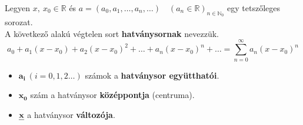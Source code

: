 \documentclass[tikz,12pt,margin=0px]{article}
\makeatletter
\renewcommand\paragraph{%
	\@startsection{paragraph}{4}{0mm}%
	{-\baselineskip}%
	{.5\baselineskip}%
	{\normalfont\normalsize\bfseries}}
\makeatother
\begin{document}
	






    \noindent Legyen $x,\ x_{0} \in \mathbb{R}$ és $a =(a_{0}, a_{1},\ldots, a_{n}, \ldots)\quad (a_{n} \in \mathbb{R})_{n \in \mathbb{N}_{0}}$ egy tetszőleges sorozat. \\
    A következő alakú végtelen sort \textbf{hatványsornak} nevezzük.
    \[
        a_{0} + a_{1}(x-x_{0}) + a_{2}(x-x_{0})^{2}+ \ldots + a_{n}(x-x_{0})^{n} + \ldots = \sum\limits_{n=0}^{\infty}a_{n}(x-x_{0})^{n}
    \]

    \begin{itemize}
        \item $\boldsymbol{a_{i}}\ (i = 0,1,2\ldots)$ számok a \textbf{hatványsor együtthatói}.
        \item $\boldsymbol{x_{0}}$ szám a hatványsor \textbf{középpontja} (centruma).
        \item $\textbf{\emph{x}}$ a hatványsor \textbf{változója}.
    \end{itemize}
\end{document}
